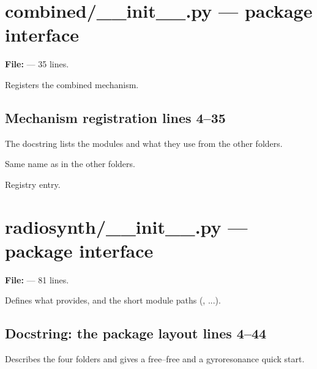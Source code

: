 \chapter{combined/\_\_init\_\_.py --- package interface}
\label{mod:combined:init.py}
\textbf{File:}  --- 35 lines.

Registers the combined mechanism.

\section*{\normalsize Mechanism registration \hfill{\small\mdseries\color{gray}lines 4--35}}

The docstring lists the modules and what they use from the other folders.

\begin{lines}
\item[L.25] Same name as in the other folders.
\item[L.27] Registry entry.
\end{lines}

\chapter{radiosynth/\_\_init\_\_.py --- package interface}
\label{mod:init.py}
\textbf{File:}  --- 81 lines.

Defines what  provides, and the short module paths
(, ...).

\section*{\normalsize Docstring: the package layout \hfill{\small\mdseries\color{gray}lines 4--44}}

Describes the four folders and gives a free--free and a gyroresonance quick start.

